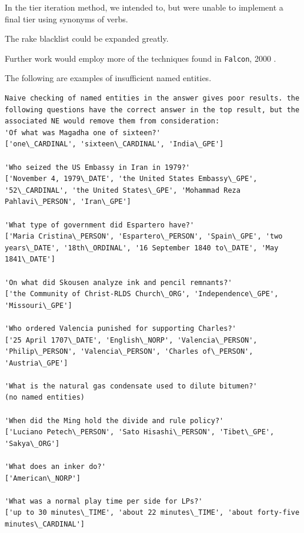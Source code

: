 \documentclass[11pt]{article}
\begin{document}
In the tier iteration method, we intended to, but were unable to implement a final tier using synonyms of verbs.

The rake blacklist could be expanded greatly.

Further work would employ more of the techniques found in \texttt{Falcon}, 2000 \cite{falcon2000}.


The following are examples of insufficient named entities.

\begin{lstlisting}
Naive checking of named entities in the answer gives poor results. the following questions have the correct answer in the top result, but the associated NE would remove them from consideration:
'Of what was Magadha one of sixteen?'
['one\_CARDINAL', 'sixteen\_CARDINAL', 'India\_GPE']

'Who seized the US Embassy in Iran in 1979?'
['November 4, 1979\_DATE', 'the United States Embassy\_GPE', '52\_CARDINAL', 'the United States\_GPE', 'Mohammad Reza Pahlavi\_PERSON', 'Iran\_GPE']

'What type of government did Espartero have?'
['Maria Cristina\_PERSON', 'Espartero\_PERSON', 'Spain\_GPE', 'two years\_DATE', '18th\_ORDINAL', '16 September 1840 to\_DATE', 'May 1841\_DATE']

'On what did Skousen analyze ink and pencil remnants?'
['the Community of Christ-RLDS Church\_ORG', 'Independence\_GPE', 'Missouri\_GPE']

'Who ordered Valencia punished for supporting Charles?'
['25 April 1707\_DATE', 'English\_NORP', 'Valencia\_PERSON', 'Philip\_PERSON', 'Valencia\_PERSON', 'Charles of\_PERSON', 'Austria\_GPE']

'What is the natural gas condensate used to dilute bitumen?'
(no named entities)

'When did the Ming hold the divide and rule policy?'
['Luciano Petech\_PERSON', 'Sato Hisashi\_PERSON', 'Tibet\_GPE', 'Sakya\_ORG']

'What does an inker do?'
['American\_NORP']

'What was a normal play time per side for LPs?'
['up to 30 minutes\_TIME', 'about 22 minutes\_TIME', 'about forty-five minutes\_CARDINAL']
\end{lstlisting}

{}

\end{document}

